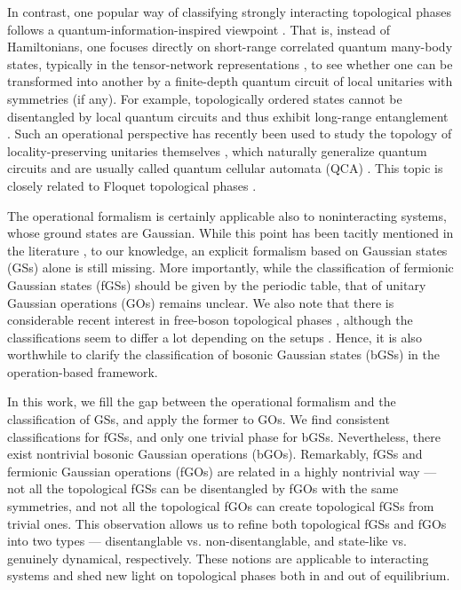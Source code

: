 \documentclass[prl,twocolumn,preprintnumbers,superscriptaddress,amsmath,amssymb]{revtex4-1}
\begin{document}
In contrast, one popular way of classifying strongly interacting topological phases follows a quantum-information-inspired viewpoint \cite{Chen2010,Chen2011,Chen2013,Pollmann2010,Pollmann2011,Schuch2010,Schuch2011}. That is, instead of Hamiltonians, one focuses directly on short-range correlated quantum many-body states, typically in the tensor-network representations \cite{Verstraete2008,Orus2014,Cirac2020}, to see whether one can be transformed into another by a finite-depth quantum circuit of local unitaries with symmetries (if any). For example, topologically ordered states cannot be disentangled by local quantum circuits and thus exhibit long-range entanglement \cite{Chen2010}. Such an operational perspective has recently been used to study the topology of locality-preserving unitaries themselves \cite{Gross2012,Cirac2017,Chen2018,Gong2020,Piroli2021,Ranard2020,Bols2021}, which naturally generalize quantum circuits and are usually called quantum cellular automata (QCA) \cite{Schumacher2004,Arrighi2019,Farrelly2020}. This topic is closely related to Floquet topological phases \cite{Kitagawa2010,Jiang2011,Lindner2013,Else2016,Po2016,Potter2017,Harper2017b,Roy2017,Fidkowski2019,Zhang2021}. 

The operational formalism is certainly applicable also to noninteracting systems, whose ground states are Gaussian. While this point has been tacitly mentioned in the literature \cite{Fidkowski2010,Wen2012,Hastings2013}, to our knowledge, an explicit formalism based on Gaussian states (GSs) alone is still missing. More importantly, while the classification of fermionic Gaussian states (fGSs) should be given by the periodic table, that of unitary Gaussian operations (GOs) remains unclear. We also note that there is considerable recent interest in free-boson topological phases \cite{Clerk2018,Ozawa2019,Ohashi2020}, although the classifications seem to differ a lot depending on the setups \cite{He2021,Clerk2021}. Hence, it is also worthwhile to clarify the classification of bosonic Gaussian states (bGSs) in the operation-based framework.

In this work, we fill the gap between the operational formalism and the classification of GSs, and apply the former to GOs. We find consistent classifications for fGSs, and only one trivial phase for bGSs. Nevertheless, there exist nontrivial bosonic Gaussian operations (bGOs). Remarkably, fGSs and fermionic Gaussian operations (fGOs) are related in a highly nontrivial way --- not all the topological fGSs can be disentangled by fGOs with the same symmetries, and not all the topological fGOs can create topological fGSs from trivial ones. This observation allows us to refine both topological fGSs and fGOs into two types --- disentanglable vs. non-disentanglable, and state-like vs. genuinely dynamical, respectively. These notions are applicable to interacting systems and shed new light on topological phases both in and out of equilibrium. 
\end{document}
